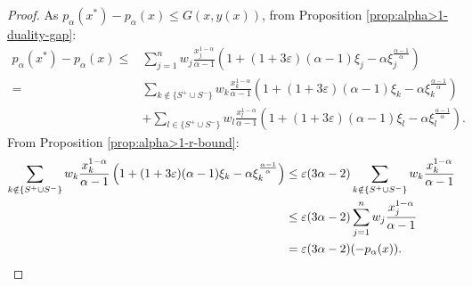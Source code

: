 \documentclass[11pt]{article}
\begin{document}
\begin{proof}
As $p_\alpha(x^*)-p_\alpha(x)\leq G(x, y(x))$, from Proposition \ref{prop:alpha>1-duality-gap}:
\begin{align*}
p_\alpha(x^*) - p_\alpha(x) \leq& \sum_{j=1}^n w_j\frac{x_j^{1-\alpha}}{\alpha-1}\left(1 + (1+3\varepsilon)(\alpha-1)\xi_j -\alpha\xi_j^{\frac{\alpha-1}{\alpha}} \right)\\
=& \sum_{k\notin\{S^+\cup S^-\}} w_k\frac{x_k^{1-\alpha}}{\alpha-1}\left(1 + (1+3\varepsilon)(\alpha-1)\xi_k -\alpha\xi_k^{\frac{\alpha-1}{\alpha}} \right)\\ 
&+ \sum_{l\in\{S^+\cup S^-\}} w_l\frac{x_l^{1-\alpha}}{\alpha-1}\left(1 + (1+3\varepsilon)(\alpha-1)\xi_l -\alpha\xi_l^{\frac{\alpha-1}{\alpha}} \right).
\end{align*}
From Proposition \ref{prop:alpha>1-r-bound}:
\begin{align}
\sum_{k\notin\{S^+\cup S^-\}} w_k\frac{x_k^{1-\alpha}}{\alpha-1}\left(1 + (1+3\varepsilon)(\alpha-1)\xi_k -\alpha\xi_k^{\frac{\alpha-1}{\alpha}} \right) &\leq \varepsilon(3\alpha - 2)\sum_{k\notin\{S^+\cup S^-\}} w_k\frac{x_k^{1-\alpha}}{\alpha-1}\notag\\
&\leq \varepsilon(3\alpha - 2) \sum_{j=1}^n w_j\frac{x_j^{1-\alpha}}{\alpha-1}\notag\\
&= \varepsilon(3\alpha - 2)(-p_{\alpha}(x)). \label{eq:approx-for-passive-x}
\end{align}


\end{proof}
\end{document}
